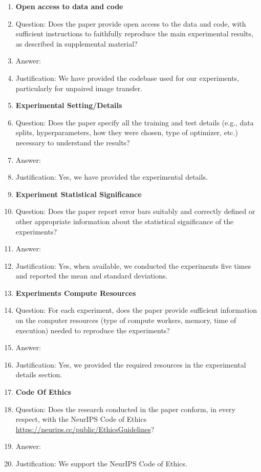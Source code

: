 \documentclass[nohyperref]{article}
\theoremstyle{plain}
\theoremstyle{remark}
\begin{document}
\begin{enumerate}
\item {\bf Open access to data and code}
    \item[] Question: Does the paper provide open access to the data and code, with sufficient instructions to faithfully reproduce the main experimental results, as described in supplemental material?
    \item[] Answer: \answerYes{} %
    \item[] Justification: We have provided the codebase used for our experiments, particularly for unpaired image transfer.


\item {\bf Experimental Setting/Details}
    \item[] Question: Does the paper specify all the training and test details (e.g., data splits, hyperparameters, how they were chosen, type of optimizer, etc.) necessary to understand the results?
    \item[] Answer: \answerYes{} %
    \item[] Justification: Yes, we have provided the experimental details.
    
\item {\bf Experiment Statistical Significance}
    \item[] Question: Does the paper report error bars suitably and correctly defined or other appropriate information about the statistical significance of the experiments?
    \item[] Answer: \answerYes{} %
    \item[] Justification: Yes, when available, we conducted the experiments five times and reported the mean and standard deviations.

\item {\bf Experiments Compute Resources}
    \item[] Question: For each experiment, does the paper provide sufficient information on the computer resources (type of compute workers, memory, time of execution) needed to reproduce the experiments?
    \item[] Answer: \answerYes{} %
    \item[] Justification: Yes, we provided the required resources in the experimental details section.
    
\item {\bf Code Of Ethics}
    \item[] Question: Does the research conducted in the paper conform, in every respect, with the NeurIPS Code of Ethics \url{https://neurips.cc/public/EthicsGuidelines}?
    \item[] Answer: \answerYes{} %
    \item[] Justification: We support the NeurIPS Code of Ethics.


\end{enumerate}
\end{document}

